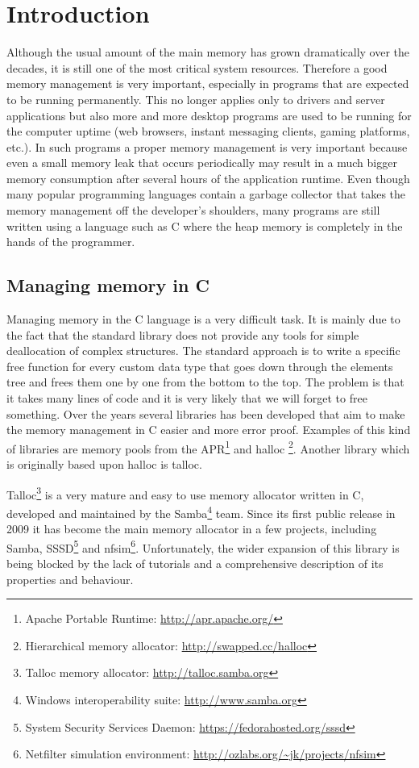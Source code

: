 \chapter{Introduction}

Although the usual amount of the main memory has grown dramatically over the
decades, it is still one of the most critical system resources. Therefore a good
memory management is very important, especially in programs that are expected to
be running permanently. This no longer applies only to drivers and server
applications but also more and more desktop programs are used to be running
for the computer uptime (web browsers, instant messaging clients, gaming
platforms, etc.). In such programs a proper memory management is very important
because even a small memory leak that occurs periodically may result in a much
bigger memory consumption after several hours of the application runtime. Even
though many popular programming languages contain a garbage collector that takes
the memory management off the developer's shoulders, many programs are still
written using a language such as C where the heap memory is completely in the
hands of the programmer.

\section{Managing memory in C}

Managing memory in the C language is a very difficult task. It is mainly due to
the fact that the standard library does not provide any tools for simple
deallocation of complex structures. The standard approach is to write a
specific free function for every custom data type that goes down through the
elements tree and frees them one by one from the bottom to the top. The problem
is that it takes many lines of code and it is very likely that we will forget to
free something. Over the years several libraries has been developed that aim
to make the memory management in C easier and more error proof. Examples of this
kind of libraries are memory pools from the APR\footnote{Apache Portable
Runtime: \url{http://apr.apache.org/}} and halloc \footnote{Hierarchical
memory allocator: \url{http://swapped.cc/halloc}}. Another library which is originally
based upon halloc is talloc.

Talloc\footnote{Talloc memory allocator: \url{http://talloc.samba.org}} is a
very mature and easy to use memory allocator written in C, developed and
maintained by the Samba\footnote{Windows interoperability suite:
\url{http://www.samba.org}} team. Since its first public release in 2009 it has
become the main memory allocator in a few projects, including Samba,
SSSD\footnote{System Security Services Daemon:
\url{https://fedorahosted.org/sssd}} and nfsim\footnote{Netfilter simulation
environment: \url{http://ozlabs.org/~jk/projects/nfsim}}. Unfortunately, the
wider expansion of this library is being blocked by the lack of tutorials and a
comprehensive description of its properties and behaviour.

